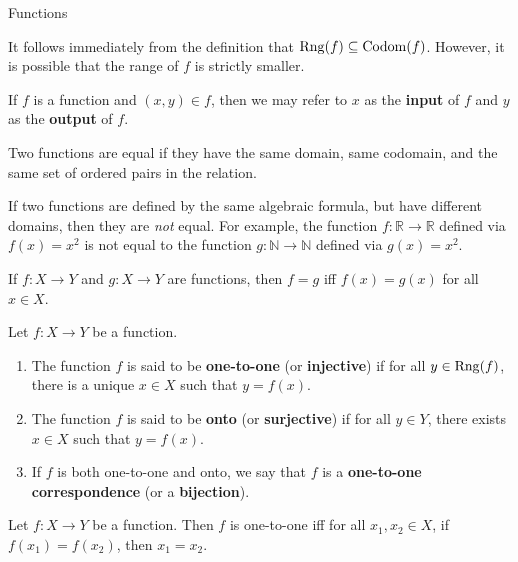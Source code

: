 \begin{section}{Functions}
\begin{remark}
It follows immediately from the definition that $\operatorname{Rng}(f)\subseteq \operatorname{Codom}(f)$.  However, it is possible that the range of $f$ is strictly smaller.
\end{remark}

\begin{remark}
If $f$ is a function and $(x,y)\in f$, then we may refer to $x$ as the \textbf{input} of $f$ and $y$ as the \textbf{output} of $f$.
\end{remark}

\begin{definition}
Two functions are equal if they have the same domain, same codomain, and the same set of ordered pairs in the relation.
\end{definition}

\begin{remark}
If two functions are defined by the same algebraic formula, but have different domains, then they are \emph{not} equal.  For example, the function $f:\mathbb{R}\to \mathbb{R}$ defined via $f(x)=x^{2}$ is not equal to the function $g:\mathbb{N}\to\mathbb{N}$ defined via $g(x)=x^{2}$.
\end{remark}

\begin{theorem}
If $f:X\to Y$ and $g:X\to Y$ are functions, then $f=g$ iff $f(x)=g(x)$ for all $x\in X$.
\end{theorem}

\begin{definition}
Let $f:X\to Y$ be a function.
\begin{enumerate}
\item The function $f$ is said to be \textbf{one-to-one} (or \textbf{injective}) if for all $y\in \operatorname{Rng}(f)$, there is a unique $x\in X$ such that $y=f(x)$.
\item The function $f$ is said to be \textbf{onto} (or \textbf{surjective}) if for all $y\in Y$, there exists $x\in X$ such that $y=f(x)$.
\item If $f$ is both one-to-one and onto, we say that $f$ is a \textbf{one-to-one correspondence} (or a \textbf{bijection}).
\end{enumerate}
\end{definition}

\begin{theorem}
Let $f:X\to Y$ be a function.  Then $f$ is one-to-one iff for all $x_{1}, x_{2}\in X$, if $f(x_{1})=f(x_{2})$, then $x_{1}=x_{2}$.
\end{theorem}


\end{section}
